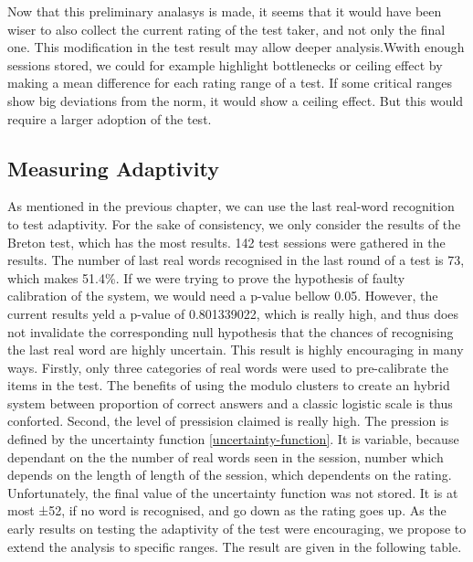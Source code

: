 Now that this preliminary analasys is made, it seems that it would have been wiser to also collect the current rating of the test taker, and not only the final one. This modification in the test result may allow deeper analysis.Wwith enough sessions stored, we could for example highlight bottlenecks or ceiling effect by making a mean difference for each rating range of a test. If some critical ranges show big deviations from the norm, it would show a ceiling effect. But this would require a larger adoption of the test.

\subsection{Measuring Adaptivity}
As mentioned in the previous chapter, we can use the last real-word recognition to test adaptivity. For the sake of consistency, we only consider the results of the Breton test, which has the most results. 142 test sessions were gathered in the results. The number of last real words recognised in the last round of a test is 73, which makes 51.4\%. If we were trying to prove the hypothesis of faulty calibration of the system, we would need a p-value bellow 0.05. However, the current results yeld a p-value of 0.801339022, which is really high, and thus does not invalidate the corresponding null hypothesis that the chances of recognising the last real word are highly uncertain.
This result is highly encouraging in many ways. Firstly, only three categories of real words were used to pre-calibrate the items in the test. The benefits of using the modulo clusters to create an hybrid system between proportion of correct answers and a classic logistic scale is thus conforted. Second, the level of pressision claimed is really high. The pression is defined by the uncertainty function \ref{uncertainty-function}. It is variable, because dependant on the the number of real words seen in the session, number which depends on the length of length of the session, which dependents on the rating. Unfortunately, the final value of the uncertainty function was not stored. It is at most ±52, if no word is recognised, and go down as the rating goes up.
As the early results on testing the adaptivity of the test were encouraging, we propose to extend the analysis to specific ranges. The result are given in the following table.

